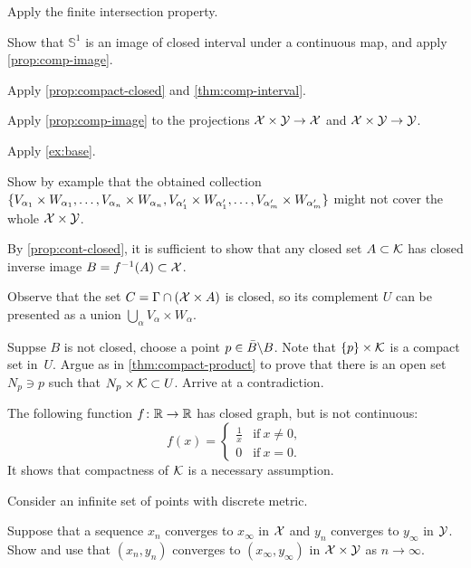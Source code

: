 \begin{multicols}{2}
 Apply the finite intersection property.

Show that $\mathbb{S}^1$ is an image of closed interval under a continuous map, and apply \ref{prop:comp-image}.

Apply \ref{prop:compact-closed} and \ref{thm:comp-interval}.

Apply \ref{prop:comp-image} to the projections $\mathcal{X}\times\mathcal{Y}\to\mathcal{X}$ and $\mathcal{X}\times\mathcal{Y}\to\mathcal{Y}$.

 Apply \ref{ex:base}.

Show by example that the obtained collection 
$\{V_{\alpha_1}\times W_{\alpha_1},\z\dots,V_{\alpha_n}\z\times W_{\alpha_n},V_{\alpha_1'}\z\times W_{\alpha_1'},\z\dots,V_{\alpha_m'}\z\times W_{\alpha_m'}\}$
might not cover the whole $\mathcal{X}\times\mathcal{Y}$.

By \ref{prop:cont-closed}, it is sufficient to show that any closed set $A\subset\mathcal{K}$ has closed inverse image $B=f^{-1}(A)\subset\mathcal{X}$.

Observe that the set $C=\Gamma\cap (\mathcal{X}\times A)$ is closed,
so its complement $U$ can be presented as a union $\bigcup_\alpha V_\alpha\times W_\alpha$.

Suppse $B$ is not closed, choose a point $p\z\in \bar B\backslash B$.
Note that $\{p\}\times \mathcal{K}$ is a compact set in~$U$.
Argue as in \ref{thm:compact-product} to prove that there is an open set $N_p\ni p$ such that $N_p\times \mathcal{K}\subset U$.
Arrive at a contradiction.

The following function $f\colon\mathbb{R}\to\mathbb{R}$ has closed graph, but is not continuous:
\[f(x)=
\begin{cases}
\tfrac1x&\text{if}\ x\ne 0,
\\
0&\text{if}\ x= 0.
\end{cases}
\]
It shows that compactness of $\mathcal{K}$ is a necessary assumption.

Consider an infinite set of points with discrete metric.

Suppose that a sequence $x_n$ converges to $x_\infty$ in $\mathcal{X}$ 
and $y_n$ converges to $y_\infty$ in $\mathcal{Y}$.
Show and use that $(x_n,y_n)$ converges to $(x_\infty,y_\infty)$ in $\mathcal{X}\times\mathcal{Y}$ as $n\to\infty$.


\end{multicols}
